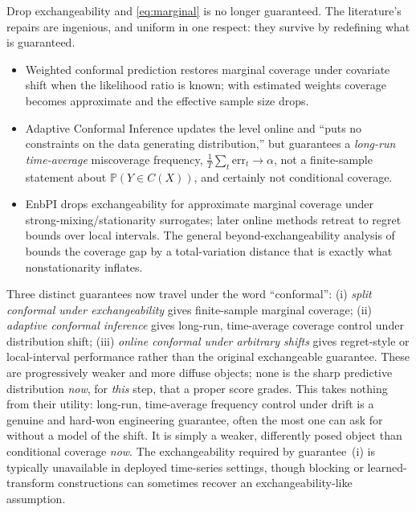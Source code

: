 \documentclass[11pt]{article}
\theoremstyle{definition}
\renewcommand{\Pr}{\mathbb{P}}
\begin{document}
Drop exchangeability and \eqref{eq:marginal} is no longer guaranteed. The literature's
repairs are ingenious, and uniform in one respect: they survive by redefining what is
guaranteed.
\begin{itemize}
  \item Weighted conformal prediction \citep{tibshirani2019conformal} restores
  marginal coverage under covariate shift when the likelihood ratio is known; with
  estimated weights coverage becomes approximate and the effective sample size drops.
  \item Adaptive Conformal Inference \citep{gibbs2021adaptive} updates the level
  online and ``puts no constraints on the data generating distribution,'' but guarantees
  a \emph{long-run time-average} miscoverage frequency,
  $\frac1T\sum_t \mathrm{err}_t\to\alpha$, not a finite-sample statement about
  $\Pr(Y\in C(X))$, and certainly not conditional coverage.
  \item EnbPI \citep{xu2021conformal} drops exchangeability for approximate
  marginal coverage under strong-mixing/stationarity surrogates; later online methods
  \citep{zaffran2022adaptive,gibbs2024conformal} retreat to regret bounds over local
  intervals. The general beyond-exchangeability analysis of \citet{barber2023conformal}
  bounds the coverage gap by a total-variation distance that is exactly what
  nonstationarity inflates.
\end{itemize}
Three distinct guarantees now travel under the word ``conformal'':
(i) \emph{split conformal under exchangeability} gives finite-sample marginal coverage;
(ii) \emph{adaptive conformal inference} gives long-run, time-average coverage control
under distribution shift; (iii) \emph{online conformal under arbitrary shifts} gives
regret-style or local-interval performance rather than the original exchangeable
guarantee. These are progressively weaker and more diffuse objects; none is the sharp
predictive distribution \emph{now}, for \emph{this} step, that a proper score grades. This
takes nothing from their utility: long-run, time-average frequency control under drift is a
genuine and hard-won engineering guarantee, often the most one can ask for without a model
of the shift. It is simply a weaker, differently posed object than conditional coverage
\emph{now}. The exchangeability required by guarantee~(i) is typically unavailable in deployed
time-series settings, though blocking or learned-transform constructions can sometimes
recover an exchangeability-like assumption.
\end{document}
